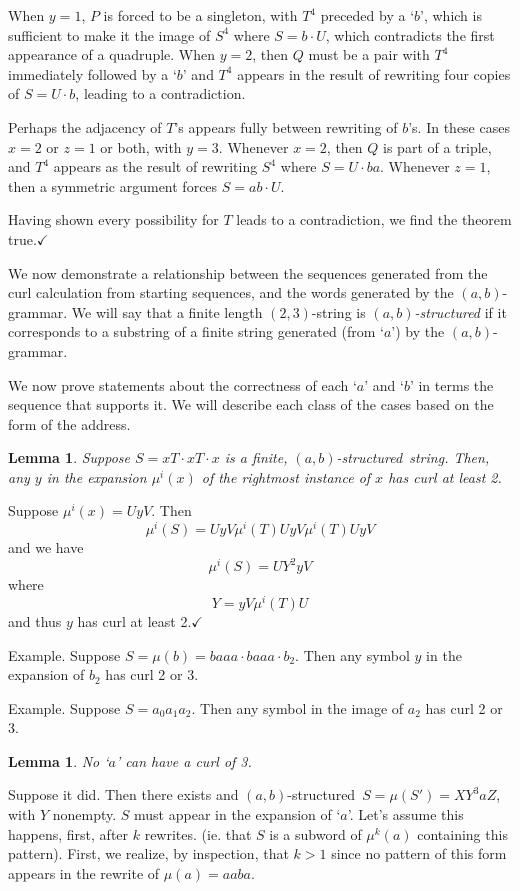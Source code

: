 \documentclass[11pt]{article}
\def\emph#1{{\em #1\/}}
\def\term#1{\emph{#1}}
\newcounter{thm}
\newtheorem{lemma}[thm]{Lemma}
\def\QED{$\checkmark$}
\def\ni{\noindent}
\def\ab{$(a,b)$}
\def\twth{$(2,3)$}
\def\abg{\ab-grammar}
\def\abs{\ab-structured}
\def\q#1{`$#1$'}
\def\Proof{\ni{\bf Proof:} }
\begin{document}
When $y=1$, $P$ is forced to be a singleton, with $T^4$ preceded by a \q{b}, which is sufficient to make it the image
of $S^4$ where $S=b\cdot U$, which contradicts the first appearance of a quadruple.  When $y=2$, then $Q$ must be a pair with $T^4$ immediately followed by a \q{b} and $T^4$ appears in the result of rewriting four copies of $S=U\cdot b$, leading to a contradiction.

Perhaps the adjacency of $T$'s appears fully between rewriting of $b$'s.  In these cases $x=2$ or $z=1$ or both, with
$y=3$.  Whenever $x=2$, then $Q$ is part of a triple, and $T^4$ appears as the result of rewriting $S^4$ where $S=U\cdot ba$.  Whenever $z=1$, then a symmetric argument forces $S=ab\cdot U$.

Having shown every possibility for $T$ leads to a contradiction, we find the theorem true.\QED

\medskip

We now demonstrate a relationship between the sequences generated from the
curl calculation from starting sequences, and the words generated by the
\abg. We will say that a finite length \twth-string is \term{\abs}
if it corresponds to a substring of a finite string generated (from \q{a}) by the
\abg.

We now prove statements about the correctness of each \q{a} and \q{b} in terms
the sequence that supports it.  We will describe each class of the cases
based on the form of the address.

\begin{lemma}
Suppose $S=xT\cdot xT\cdot x$ is a finite, \abs\ string.  Then, any $y$ in
the expansion $\mu^i(x)$ of the rightmost instance of $x$ has curl at least 2.
\end{lemma}
\Proof Suppose $\mu^i(x)=UyV$.  Then 
$$\mu^i(S)=UyV\mu^i(T)UyV\mu^i(T)UyV$$
\ni and we have
$$\mu^i(S)=UY^2yV$$
\ni where
$$Y=yV\mu^i(T)U$$
\ni and thus $y$ has curl at least 2.\QED

\ni Example.  Suppose $S=\mu(b)=baaa\cdot baaa\cdot b_2$.  Then any symbol
$y$ in the expansion of $b_2$ has curl 2 or 3.

\ni Example.  Suppose $S=a_0a_1a_2$.  Then any symbol in the image of $a_2$
has curl 2 or 3.

\begin{lemma}\label{lem:properacurl} No \q{a} can have a curl of 3.
\end{lemma}
\Proof Suppose it did.  Then there exists and \abs\ $S=\mu(S')=XY^3aZ$, with $Y$ nonempty.
$S$ must appear in the expansion of \q{a}.  Let's assume this happens, first,
after $k$ rewrites.  (ie. that $S$ is a subword of $\mu^k(a)$ containing this
pattern).   First,
we realize, by inspection, that $k>1$ since no pattern of this form appears
in the rewrite of $\mu(a)=aaba$.
\end{document}
